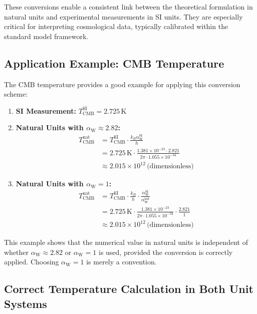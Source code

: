 \documentclass[12pt,a4paper]{article}
\newcommand{\alphaW}{\alpha_{\text{W}}}
\begin{document}
	These conversions enable a consistent link between the theoretical formulation in natural units and experimental measurements in SI units. They are especially critical for interpreting cosmological data, typically calibrated within the standard model framework.
	
	\subsection{Application Example: CMB Temperature}
	
	The CMB temperature provides a good example for applying this conversion scheme:
	
	\begin{enumerate}
		\item \textbf{SI Measurement:} \(T_{\text{CMB}}^{\text{SI}} = 2.725 \, \text{K}\)
		\item \textbf{Natural Units with \(\alphaW \approx 2.82\):}
		\begin{align}
			T_{\text{CMB}}^{\text{nat}} &= T_{\text{CMB}}^{\text{SI}} \cdot \frac{k_B \alphaW^{\text{SI}}}{h} \\
			&= 2.725 \, \text{K} \cdot \frac{1.381 \times 10^{-23} \cdot 2.821}{2\pi \cdot 1.055 \times 10^{-34}} \\
			&\approx 2.015 \times 10^{12} \, \text{(dimensionless)}
		\end{align}
		\item \textbf{Natural Units with \(\alphaW = 1\):}
		\begin{align}
			T_{\text{CMB}}^{\text{nat}} &= T_{\text{CMB}}^{\text{SI}} \cdot \frac{k_B}{h} \cdot \frac{\alphaW^{\text{SI}}}{\alphaW^{\text{nat}}} \\
			&= 2.725 \, \text{K} \cdot \frac{1.381 \times 10^{-23}}{2\pi \cdot 1.055 \times 10^{-34}} \cdot \frac{2.821}{1} \\
			&\approx 2.015 \times 10^{12} \, \text{(dimensionless)}
		\end{align}
	\end{enumerate}
	
	This example shows that the numerical value in natural units is independent of whether \(\alphaW \approx 2.82\) or \(\alphaW = 1\) is used, provided the conversion is correctly applied. Choosing \(\alphaW = 1\) is merely a convention.
	
	\subsection{Correct Temperature Calculation in Both Unit Systems}
	
\end{document}
